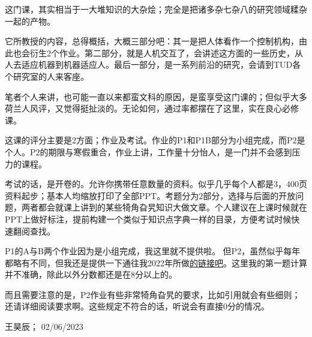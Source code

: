这门课，其实相当于一大堆知识的大杂烩；完全是把诸多杂七杂八的研究领域糅杂一起的产物。

它所教授的内容，总得概括，大概三部分吧：其一是把人体看作一个控制机构，由此也会衍生2个作业。第二部分，就是人机交互了，会讲述这方面的一些历史，从人去适应机器到机器适应人。最后一部分，是一系列前沿的研究，会请到TUD各个研究室的人来客座。

笔者个人来讲，也可能一直以来都蛮文科的原因，是蛮享受这门课的；但似乎大多荷兰人风评，又觉得挺扯淡的。无论如何，通过率都摆在了这里，实在良心必修课。

这课的评分主要是2方面；作业及考试。作业的P1和P1B部分为小组完成，而P2是个人。P2的期限与寒假重合，作业上讲，工作量十分怡人，是一门并不会感到压力的课程。

考试的话，是开卷的。允许你携带任意数量的资料。似乎几乎每个人都是3，400页资料起步；基本人均缩放打印了全部PPT。考题分为2部分，选择与后面的开放问题，两者都会就课上讲到的某些犄角旮旯知识大做文章。个人建议在上课时候就在PPT上做好标注，提前构建一个类似于知识点字典一样的目录，方便考试时候快速翻阅查找。

P1的A与B两个作业因为是小组完成，我这里就不提供啦。 但P2，虽然似乎每年都略有不同，但我还是提供一下通往我2022年所做\href{https://drive.google.com/file/d/1GwwX7ZxEE8R7JeDm6NcHQu_IA34ZqyRe/view?usp=sharing}{\uline{的链接吧}}。这里我的第一题计算并不准确，除此以外分数都还是在8分以上的。

而且需要注意的是，P2作业有些非常犄角旮旯的要求，比如引用就会有些细则；还请详细阅读要求啊。这些规定不符合的话，听说会有直接0分的情况。
\begin{flushright}
王昊辰； 02/06/2023
\end{flushright}


